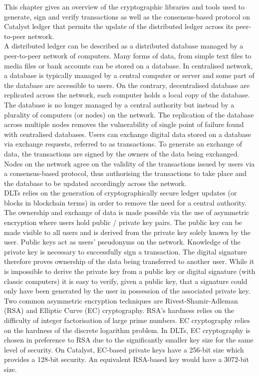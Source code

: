 This chapter gives an overview of the cryptographic libraries and tools used to generate, sign and verify transactions as well as the consensus-based protocol on Catalyst ledger that permits the update of the distributed ledger across its peer-to-peer network. \\

A distributed ledger can be described as a distributed database managed by a peer-to-peer network of computers. Many forms of data, from simple text files to media files or bank accounts can be stored on a database. In centralised network, a database is typically managed by a central computer or server and some part of the database are accessible to users. On the contrary, decentralised database are replicated across the network, each computer holds a local copy of the database. The database is no longer managed by a central authority but instead by a plurality of computers (or nodes) on the network. The replication of the database across multiple nodes removes the vulnerability of single point of failure found with centralised databases. Users can exchange digital data stored on a database via exchange requests, referred to as transactions. To generate an exchange of data, the transactions are signed by the owners of the data being exchanged. Nodes on the network agree on the validity of the transactions issued by users via a consensus-based protocol, thus authorising the transactions to take place and the database to be updated accordingly across the network. \\

DLTs relies on the generation of cryptographically secure ledger updates (or blocks in blockchain terms) in order to remove the need for a central authority. The ownership and exchange of data is made possible via the use of asymmetric encryption where users hold public / private key pairs. The public key can be made visible to all users and is derived from the private key solely known by the user. Public keys act as users' pseudonyms on the network. Knowledge of the private key is necessary to successfully sign a transaction. The digital signature therefore proves ownership of the data being transferred to another user. While it is impossible to derive the private key from a public key or digital signature (with classic computers) it is easy to verify, given a public key, that a signature could only have been generated by the user in possession of the associated private key. \\

Two common asymmetric encryption techniques are Rivest-Shamir-Adleman (RSA) and Elliptic Curve (EC) cryptography. RSA's hardness relies on the difficulty of integer factorisation of large prime numbers. EC cryptography relies on the hardness of the discrete logarithm problem. In DLTs, EC cryptography is chosen in preference to RSA due to the significantly smaller key size for the same level of security. On Catalyst, EC-based private keys have a 256-bit size which provides a 128-bit security. An equivalent RSA-based key would have a 3072-bit size.

